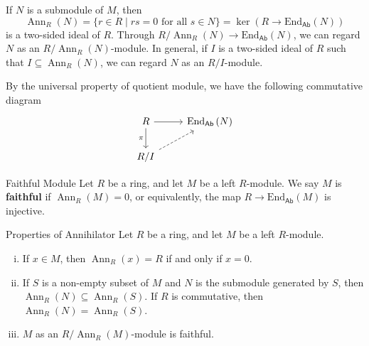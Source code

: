 \begin{proposition}{}{}
    If $N$ is a submodule of $M$, then 
    \[
        \operatorname{Ann}_R(N)=\{r \in R \mid r s=0 \text { for all } s \in N\}=\ker \left(R\longrightarrow\mathrm{End}_{\mathsf{Ab}}\left(N\right)\right)  
    \]
    is a two-sided ideal of $R$. Through $R/\operatorname{Ann}_R(N)\to \mathrm{End}_{\mathsf{Ab}}\left(N\right)$, we can regard $N$ as an $R/\operatorname{Ann}_R(N)$-module. In general, if $I$ is a two-sided ideal of $R$ such that $I\subseteq \operatorname{Ann}_R(N)$, we can regard $N$ as an $R/I$-module.
\end{proposition}
\begin{prf}
    By the universal property of quotient module, we have the following commutative diagram
    \[
        \begin{tikzcd}
            R \arrow[r] \arrow[d, "\pi"'] & \mathrm{End}_{\mathsf{Ab}}\left(N\right) \\
            R/I \arrow[ru, dashed]        &                                         
            \end{tikzcd}
    \]
\end{prf}

\begin{definition}{Faithful Module}{}
    Let $R$ be a ring, and let $M$ be a left $R$-module. We say $M$ is \textbf{faithful} if $\operatorname{Ann}_R(M)=0$, or equivalently, the map $R\to \mathrm{End}_{\mathsf{Ab}}(M)$ is injective.
\end{definition}

\begin{proposition}{Properties of Annihilator}{}
    Let $R$ be a ring, and let $M$ be a left $R$-module. 
    \begin{enumerate}[(i)]
        \item If $x\in M$, then $\operatorname{Ann}_R(x)=R$ if and only if $x=0$.
        \item If $S$ is a non-empty subset of $M$ and $N$ is the submodule generated by $S$, then $\operatorname{Ann}_R(N)\subseteq \operatorname{Ann}_R(S)$. If $R$ is commutative, then $\operatorname{Ann}_R(N)= \operatorname{Ann}_R(S)$.
        \item $M$ as an $R/\operatorname{Ann}_R(M)$-module is faithful.
    \end{enumerate}
\end{proposition}



